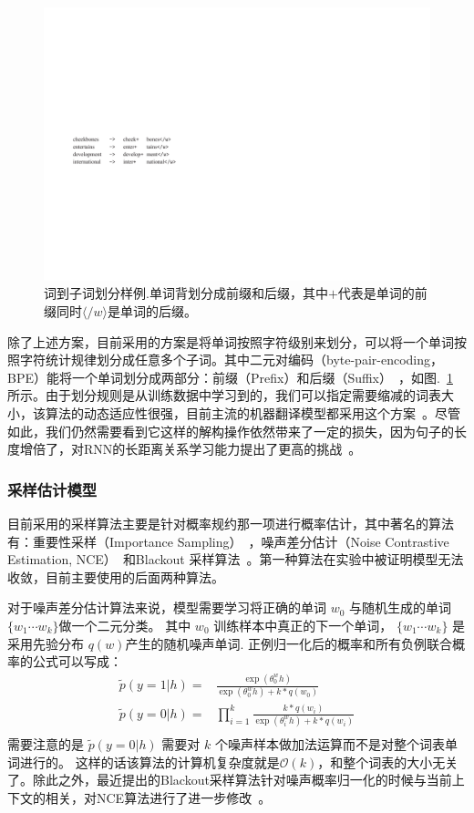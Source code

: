\documentclass[twoside,UTF8,AutoFakeBold]{buaathesis}
\begin{document}
\begin{figure}
  \centering
\includegraphics[width=0.6\linewidth]{./figures/subword}
\caption{词到子词划分样例.单词背划分成前缀和后缀，其中$+$代表是单词的前缀同时$\langle /w \rangle$是单词的后缀。}\label{fig:subword}
\end{figure}
除了上述方案，目前采用的方案是将单词按照字符级别来划分，可以将一个单词按照字符统计规律划分成任意多个子词。其中二元对编码（byte-pair-encoding，BPE）能将一个单词划分成两部分：前缀（Prefix）和后缀（Suffix）~\cite{DBLP:conf/icassp/Tucker0P94, DBLP:conf/acl/SennrichHB16a,Gage:1994:NAD:177910.177914}，如图.~\ref{fig:subword} 所示。由于划分规则是从训练数据中学习到的，我们可以指定需要缩减的词表大小，该算法的动态适应性很强，目前主流的机器翻译模型都采用这个方案~\cite{DBLP:journals/corr/JozefowiczVSSW16}。尽管如此，我们仍然需要看到它这样的解构操作依然带来了一定的损失，因为句子的长度增倍了，对RNN的长距离关系学习能力提出了更高的挑战~\cite{DBLP:conf/aaai/KimJSR16}。

\subsubsection{采样估计模型}
目前采用的采样算法主要是针对概率规约那一项进行概率估计，其中著名的算法有：重要性采样（Importance Sampling）~\cite{DBLP:journals/tnn/BengioS08}，噪声差分估计（Noise Contrastive Estimation, NCE）~\cite{DBLP:conf/icml/MnihT12}和Blackout 采样算法~\cite{DBLP:journals/iclr/JiVSAD15}。第一种算法在实验中被证明模型无法收敛，目前主要使用的后面两种算法。

对于噪声差分估计算法来说，模型需要学习将正确的单词 $w_0$ 与随机生成的单词 $\{w_1\cdots w_k\}$做一个二元分类。 其中 $w_0$ 训练样本中真正的下一个单词， $\{w_1\cdots w_k\}$ 是采用先验分布  $q(w)$产生的随机噪声单词. 正例归一化后的概率和所有负例联合概率的公式可以写成：
\begin{equation}\label{equ:nce}
\begin{split}
  \tilde{p}(y=1|h)=&\frac{\exp( \theta^w_0 h)}{ \exp( \theta^w_0 h)+k *q(w_0)}\\
  \tilde{p}(y=0|h)=&\prod_{i=1}^{k}\frac{k *q(w_i)}{\exp( \theta^w_i h)+k *q(w_i)}\\
\end{split}
\end{equation}
需要注意的是 $\tilde{p}(y=0|h)$ 需要对 $k$ 个噪声样本做加法运算而不是对整个词表单词进行的。 这样的话该算法的计算机复杂度就是$\mathcal{O}(k)$，和整个词表的大小无关了。除此之外，最近提出的Blackout采样算法针对噪声概率归一化的时候与当前上下文的相关，对NCE算法进行了进一步修改~\cite{DBLP:journals/iclr/JiVSAD15}。
\end{document}
